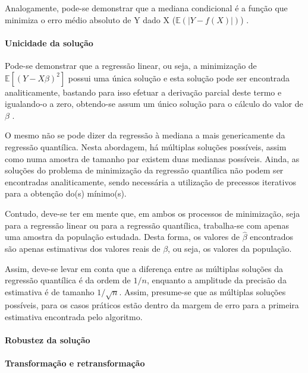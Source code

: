 \documentclass[a4paper, 12pt]{article}
\let\oldparagraph\paragraph
\renewcommand{\paragraph}[1]{\oldparagraph{#1}\mbox{}}
\begin{document}
Analogamente, pode-se demonstrar que a mediana condicional é a função
que minimiza o erro médio absoluto de Y dado X
(\(\mathbb{E}(|Y-f(X)|)\)) \autocite[260-261]{matloff2017}.

\hypertarget{unicidade-da-solucao}{%
\paragraph{Unicidade da solução}\label{unicidade-da-solucao}}

Pode-se demonstrar que a regressão linear, ou seja, a minimização de
\(\mathbb{E}[(Y - X\beta)^2]\) possui uma única solução e esta solução
pode ser encontrada analiticamente, bastando para isso efetuar a
derivação parcial deste termo e igualando-o a zero, obtendo-se assum um
único solução para o cálculo do valor de \(\beta\)
\autocite[ver][49-50]{matloff2017}.

O mesmo não se pode dizer da regressão à mediana a mais genericamente da
regressão quantílica. Nesta abordagem, há múltiplas soluções possíveis,
assim como numa amostra de tamanho par existem duas medianas possíveis.
Ainda, as soluções do problema de minimização da regressão quantílica
não podem ser encontradas analiticamente, sendo necessária a utilização
de precessos iterativos para a obtenção do(s) mínimo(s).

Contudo, deve-se ter em mente que, em ambos os processos de minimização,
seja para a regressão linear ou para a regressão quantílica, trabalha-se
com apenas uma amostra da população estudada. Desta forma, os valores de
\(\hat \beta\) encontrados são apenas estimativas dos valores reais de
\(\beta\), ou seja, os valores da população.

Assim, deve-se levar em conta que a diferença entre as múltiplas
soluções da regressão quantílica é da ordem de \(1/n\), enquanto a
amplitude da precisão da estimativa é de tamanho \(1/\sqrt{n}\). Assim,
presume-se que as múltiplas soluções possíveis, para os casos práticos
estão dentro da margem de erro para a primeira estimativa encontrada
pelo algoritmo.

\hypertarget{robustez-da-solucao}{%
\paragraph{Robustez da solução}\label{robustez-da-solucao}}

\hypertarget{transformacao-e-retransformacao}{%
\paragraph{Transformação e
retransformação}\label{transformacao-e-retransformacao}}
\end{document}
